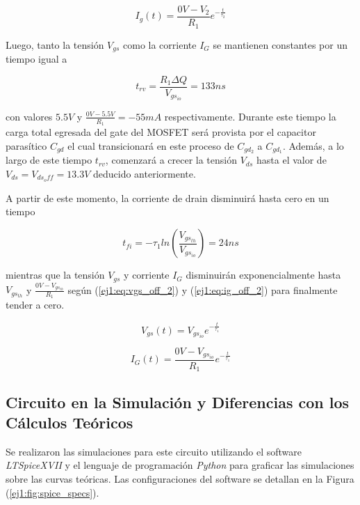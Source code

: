 \begin{equation}
I_{g}(t) = \frac{0V-V_2}{R_1} e^{-\frac{t}{\tau_2}}
\label{ej1:eq:ig_off_1}
\end{equation}

Luego, tanto la tensión $V_{gs}$ como la corriente $I_G$ se mantienen constantes por un tiempo igual a 

\begin{equation}
t_{rv} = \frac{R_1 \Delta Q}{V_{gs_{io}}} = 133ns
\label{ej1:eq:trv}
\end{equation}

con valores $5.5V$ y $\frac{0V-5.5V}{R_1} = -55mA$ respectivamente. Durante este tiempo la carga total egresada del gate del MOSFET será provista por el capacitor parasítico $C_{gd}$ el cual transicionará en este proceso de $C_{gd_2}$ a $C_{gd_1}$. Además, a lo largo de este tiempo $t_{rv}$, comenzará a crecer la tensión $V_{ds}$ hasta el valor de $V_{ds} = V_{ds_off} = 13.3V$ deducido anteriormente.

A partir de este momento, la corriente de drain disminuirá hasta cero en un tiempo

\begin{equation}
t_{fi} = -\tau_1 ln\left( \frac{V_{gs_{th}}}{V_{gs_{io}}} \right) = 24ns
\label{ej1:eq:tfi}
\end{equation}

mientras que la tensión $V_{gs}$ y corriente $I_G$ disminuirán exponencialmente hasta $V_{gs_{th}}$ y $\frac{0V-V_{gs_{th}}}{R_1}$ según (\ref{ej1:eq:vgs_off_2}) y (\ref{ej1:eq:ig_off_2}) para finalmente tender a cero.

\begin{equation}
V_{gs}(t) = V_{gs_{io}} e^{-\frac{t}{\tau_1}}
\label{ej1:eq:vgs_off_2}
\end{equation}

\begin{equation}
I_{G}(t) = \frac{0V-V_{gs_{io}}}{R_1} e^{-\frac{t}{\tau_1}}
\label{ej1:eq:ig_off_2}
\end{equation}

\subsection{Circuito en la Simulación y Diferencias con los Cálculos Teóricos}

Se realizaron las simulaciones para este circuito utilizando el software \textit{LTSpiceXVII} y el lenguaje de programación \textit{Python} para graficar las simulaciones sobre las curvas teóricas. Las configuraciones del software se detallan en la Figura (\ref{ej1:fig:spice_specs}).

